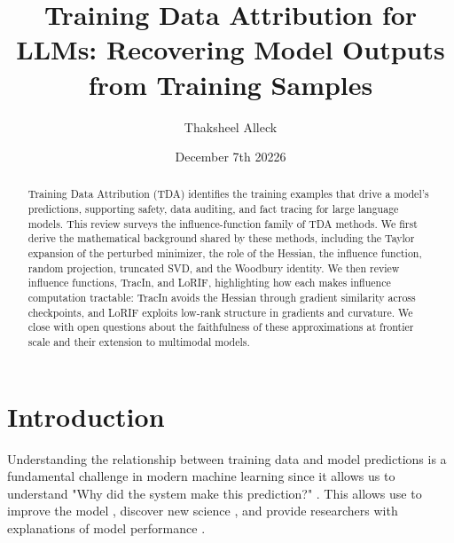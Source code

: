 \documentclass{article}
\title{Training Data Attribution for LLMs: Recovering Model Outputs from Training Samples}
\author{Thaksheel Alleck}
\date{December 7th 20226    }
\begin{document}
\maketitle

\begin{abstract}
    Training Data Attribution (TDA) identifies the training examples that drive a model's predictions, supporting safety, data auditing, and fact tracing for large language models. This review surveys the influence-function family of TDA methods. We first derive the mathematical background shared by these methods, including the Taylor expansion of the perturbed minimizer, the role of the Hessian, the influence function, random projection, truncated SVD, and the Woodbury identity. We then review influence functions, TracIn, and LoRIF, highlighting how each makes influence computation tractable: TracIn avoids the Hessian through gradient similarity across checkpoints, and LoRIF exploits low-rank structure in gradients and curvature. We close with open questions about the faithfulness of these approximations at frontier scale and their extension to multimodal models.
\end{abstract}

\section{Introduction}
Understanding the relationship between training data and model predictions is a fundamental challenge in modern machine learning since it allows us to understand "Why did the system make this prediction?" \parencite{influence-functions-2017}. This allows use to improve the model \parencite{abadi2016large}, discover new science \parencite{shrikumar2017learning}, and provide researchers with explanations of model performance \parencite{goodman2017european}.
\end{document}
